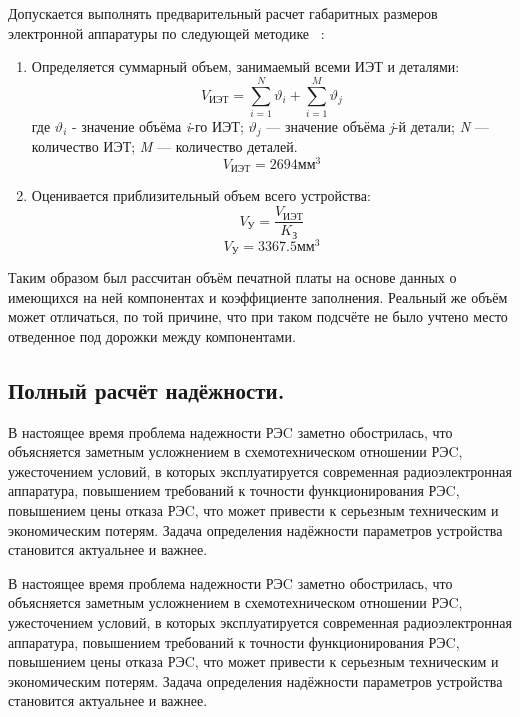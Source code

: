 Допускается выполнять предварительный расчет габаритных размеров
электронной аппаратуры по следующей методике ~\cite{Kostukevich2012}:
\begin{enumerate}
\item Определяется суммарный объем, занимаемый всеми ИЭТ и деталями:
  \begin{equation}
    V_{\textit{ИЭТ}} = \sum^N_{i=1}\vartheta_i +   \sum^M_{i=1}\vartheta_j
  \end{equation}
%
где $\vartheta_i$ - значение объёма \textit{i}-го ИЭТ;
$\vartheta_j$ — значение объёма \textit{j}-й детали;
\textit{N} — количество ИЭТ;
\textit{M} — количество деталей.
%
$$V_{\textit{ИЭТ}} =  2694 \text{мм}^3$$
\item Оценивается приблизительный объем всего устройства:
  \begin{equation}
    V_{\text{У}} = \frac{V_{\text{ИЭТ}}}{K_{\text{З}}}
  \end{equation}
%
  $$V_{\text{У}} =3367.5 \text{мм}^3$$
%
\end{enumerate}
%
Таким образом был рассчитан объём печатной платы на основе данных о
имеющихся на ней компонентах и коэффициенте заполнения.
Реальный же объём может отличаться, по той причине, что при таком
подсчёте не было учтено место отведенное под дорожки между
компонентами.



\subsection{Полный расчёт надёжности. }

В настоящее время проблема надежности РЭC заметно обострилась, что
объясняется заметным усложнением в схемотехническом отношении РЭC,
ужесточением условий, в которых эксплуатируется современная
радиоэлектронная аппаратура, повышением требований к точности
функционирования РЭC, повышением цены отказа РЭC, что может привести к
серьезным техническим и экономическим потерям. Задача определения
надёжности параметров устройства становится актуальнее и важнее.

В настоящее время проблема надежности РЭC заметно обострилась, что
объясняется заметным усложнением в схемотехническом отношении РЭC,
ужесточением условий, в которых эксплуатируется современная
радиоэлектронная аппаратура, повышением требований к точности
функционирования РЭC, повышением цены отказа РЭC, что может привести к
серьезным техническим и экономическим потерям. Задача определения
надёжности параметров устройства становится актуальнее и важнее.

